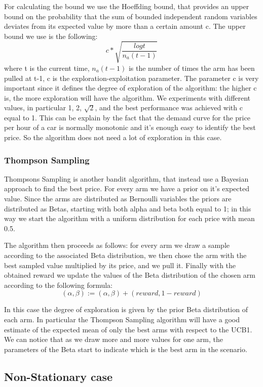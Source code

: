 For calculating the bound we use the Hoeffding bound, that provides an upper bound on the probability that the sum of bounded
independent random variables deviates from its expected value by more than a certain amount c.
The upper bound we use is the following:
\[c*\sqrt{\frac{log{t}}{n_a(t-1)}}\]
where t is the current time, $n_a(t-1)$ is the number of times the arm has been pulled at t-1, c is the
exploration-exploitation parameter.
The parameter c is very important since it defines the degree of exploration of the algorithm: the higher c is,
the more exploration will have the algorithm. We experiments with different values, in particular 1, 2, $\sqrt{2}$,
and the best performance was achieved with c equal to 1. This can be explain by the fact that the demand curve for
the price per hour of a car is normally  monotonic and it's enough easy to identify the best price. So the algorithm
does not need a lot of exploration in this case.


\subsubsection{Thompson Sampling}

Thompsons Sampling is another bandit algorithm, that instead use a Bayesian approach to find the best price.
For every arm we have a prior on it's expected value. Since the arms are distributed as Bernoulli variables the priors are
distributed as Betas, starting with both alpha and beta both equal to 1; in this way we start the algorithm with a uniform
distribution for each price with mean 0.5.

The algorithm then proceeds as follows: for every arm we draw a sample according to the associated Beta distribution,
we then chose the arm with the best sampled value multiplied by its price, and we pull it.
Finally with the obtained reward we update the values of the Beta distribution of the chosen arm according to the following formula:
\[(\alpha, \beta) := (\alpha, \beta) + (reward, 1 - reward)\] 

In this case the degree of exploration is given by the prior Beta distribution of each arm. In particular the Thompson Sampling
algorithm will have a good estimate of the expected mean of only the best arms with respect to the UCB1.
We can notice that as we draw more and more values for one arm, the parameters of the Beta start to indicate which is the best
arm in the scenario.

\subsection{Non-Stationary case}\label{subsec:non-stationary-case}

